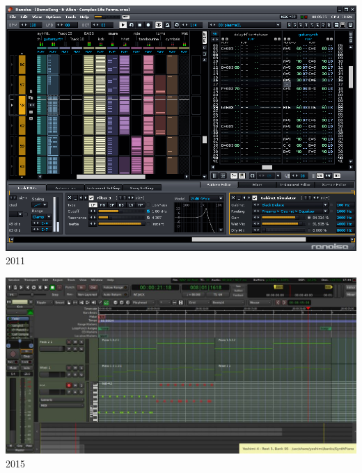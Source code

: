 \documentclass{beamer}
\begin{document}
\begin{frame}
  \begin{center}
    \includegraphics[scale=0.285]{images/renoise.png}\\
    2011
  \end{center}
\end{frame}

\begin{frame}
  \begin{center}
    \includegraphics[scale=0.36]{images/Screenshot-from-2017-08-01-17-44-03-1024x515.jpg}\\
    2015
  \end{center}
\end{frame}
\end{document}
